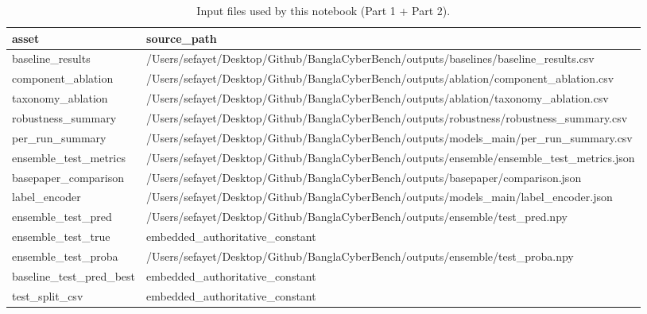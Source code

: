 \begin{table}
\caption{Input files used by this notebook (Part 1 + Part 2).}
\label{tab:source_audit}
\begin{tabular}{ll}
\toprule
asset & source_path \\
\midrule
baseline_results & /Users/sefayet/Desktop/Github/BanglaCyberBench/outputs/baselines/baseline_results.csv \\
component_ablation & /Users/sefayet/Desktop/Github/BanglaCyberBench/outputs/ablation/component_ablation.csv \\
taxonomy_ablation & /Users/sefayet/Desktop/Github/BanglaCyberBench/outputs/ablation/taxonomy_ablation.csv \\
robustness_summary & /Users/sefayet/Desktop/Github/BanglaCyberBench/outputs/robustness/robustness_summary.csv \\
per_run_summary & /Users/sefayet/Desktop/Github/BanglaCyberBench/outputs/models_main/per_run_summary.csv \\
ensemble_test_metrics & /Users/sefayet/Desktop/Github/BanglaCyberBench/outputs/ensemble/ensemble_test_metrics.json \\
basepaper_comparison & /Users/sefayet/Desktop/Github/BanglaCyberBench/outputs/basepaper/comparison.json \\
label_encoder & /Users/sefayet/Desktop/Github/BanglaCyberBench/outputs/models_main/label_encoder.json \\
ensemble_test_pred & /Users/sefayet/Desktop/Github/BanglaCyberBench/outputs/ensemble/test_pred.npy \\
ensemble_test_true & embedded_authoritative_constant \\
ensemble_test_proba & /Users/sefayet/Desktop/Github/BanglaCyberBench/outputs/ensemble/test_proba.npy \\
baseline_test_pred_best & embedded_authoritative_constant \\
test_split_csv & embedded_authoritative_constant \\
\bottomrule
\end{tabular}
\end{table}
